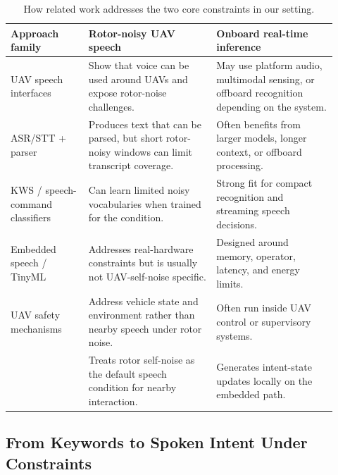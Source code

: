 \begin{table}[t]
    \centering
    \caption{How related work addresses the two core constraints in our setting.}
    \label{tab:related_work_comparison}
    \footnotesize
    \setlength{\tabcolsep}{3pt}
    \renewcommand{\arraystretch}{1.08}
    \begin{tabular}{@{}p{0.22\linewidth}p{0.36\linewidth}p{0.34\linewidth}@{}}
        \toprule
        Approach family & Rotor-noisy UAV speech & Onboard real-time inference \\
        \midrule
        UAV speech interfaces~\cite{oneata19_interspeech,oneata2021multimodal} &
        Show that voice can be used around UAVs and expose rotor-noise challenges. &
        May use platform audio, multimodal sensing, or offboard recognition depending on the system. \\
        \addlinespace
        ASR/STT + parser~\cite{lugosch19_interspeech,haghani2018audio_semantics} &
        Produces text that can be parsed, but short rotor-noisy windows can limit transcript coverage. &
        Often benefits from larger models, longer context, or offboard processing. \\
        \addlinespace
        KWS / speech-command classifiers~\cite{sainath2015cnn_kws,choi2019tcresnet,zhang2017helloedge} &
        Can learn limited noisy vocabularies when trained for the condition. &
        Strong fit for compact recognition and streaming speech decisions. \\
        \addlinespace
        Embedded speech / TinyML~\cite{david2021tflm,lin2020mcunet,banbury2021mlperftiny} &
        Addresses real-hardware constraints but is usually not UAV-self-noise specific. &
        Designed around memory, operator, latency, and energy limits. \\
        \addlinespace
        UAV safety mechanisms~\cite{eu2019uasops,eu2019uasdesign} &
        Address vehicle state and environment rather than nearby speech under rotor noise. &
        Often run inside UAV control or supervisory systems. \\
        \addlinespace
        \sys{} &
        Treats rotor self-noise as the default speech condition for nearby interaction. &
        Generates intent-state updates locally on the embedded path. \\
        \bottomrule
    \end{tabular}
\end{table}

\subsection{From Keywords to Spoken Intent Under Constraints}

